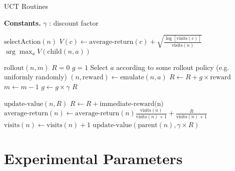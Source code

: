 \documentclass[twoside,11pt]{article}
\begin{document}
\begin{algorithm}
\caption{UCT Routines\label{algo:uct_routines}}
\begin{algorithmic}
\item[\textbf{Constants.}] $\gamma$ : discount factor

\STATE
\item[$\text{selectAction}(n)$]
  \STATE $V(c) \gets \text{average-return}(c) + \sqrt{\frac{\log\left [ {\text{visits}(c)}  \right ]}{\text{visits}(n)}}$
\ENDFOR
\RETURN $\arg \max_a V(\text{child}(n,a))$

\STATE
\item[$\text{rollout}(n, m)$]
\STATE $R = 0$ 
\STATE $g = 1$
  \STATE Select $a$ according to some rollout policy (e.g. uniformly randomly)
  \STATE $(n, \text{reward}) \gets \text{emulate}(n, a)$
  \STATE $R \gets R + g \times \text{reward}$
  \STATE $m \gets m - 1$
  \STATE $g \gets g \times \gamma$
\ENDWHILE
\RETURN $R$ 

\STATE
\item[$\text{update-value}(n, R)$]
\STATE $R \gets R + \text{immediate-reward(n)}$ 
\STATE $\text{average-return}(n) \gets \text{average-return}(n) \frac{\text{visits}(n)}{\text{visits}(n)+1} + \frac{R}{\text{visits}(n) + 1}$
\STATE $\text{visits}(n) \gets \text{visits}(n) + 1$
  \STATE $\text{update-value}(\text{parent}(n), \gamma \times R)$
\ENDIF
\end{algorithmic}
\end{algorithm}

\newpage
\section{Experimental Parameters}
\label{appendix:parameters}
\end{document}
